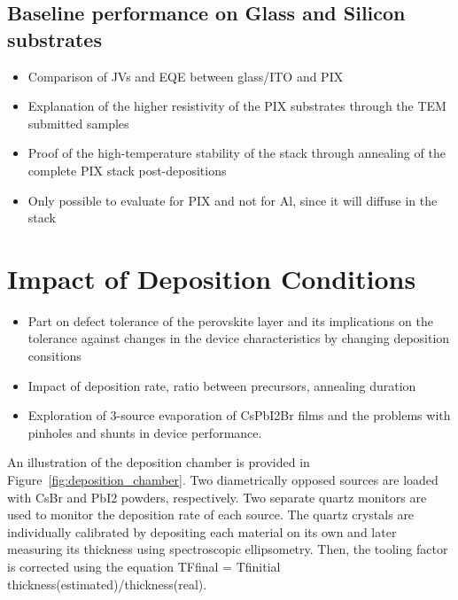 \subsection{Baseline performance on Glass and Silicon substrates}

\begin{itemize}
    \item Comparison of JVs and EQE between glass/ITO and PIX 
    \item Explanation of the higher resistivity of the PIX substrates through the TEM submitted samples
    \item Proof of the high-temperature stability of the stack through annealing of the complete PIX stack post-depositions
    \item Only possible to evaluate for PIX and not for Al, since it will diffuse in the stack 
\end{itemize}

\section{Impact of Deposition Conditions}

\begin{itemize}
    \item Part on defect tolerance of the perovskite layer and its implications on the tolerance against changes in the device characteristics by changing deposition consitions
    \item Impact of deposition rate, ratio between precursors, annealing duration
    \item Exploration of 3-source evaporation of CsPbI2Br films and the problems with pinholes and shunts in device performance. 
\end{itemize}


An illustration of the deposition chamber is provided in Figure~\ref{fig:deposition_chamber}. Two diametrically opposed sources are loaded with CsBr and PbI2 powders, respectively. Two separate quartz monitors are used to monitor the deposition rate of each source. The quartz crystals are individually calibrated by depositing each material on its own and later measuring its thickness using spectroscopic ellipsometry. Then, the tooling factor is corrected using the equation TFfinal = Tfinitial thickness(estimated)/thickness(real). 




